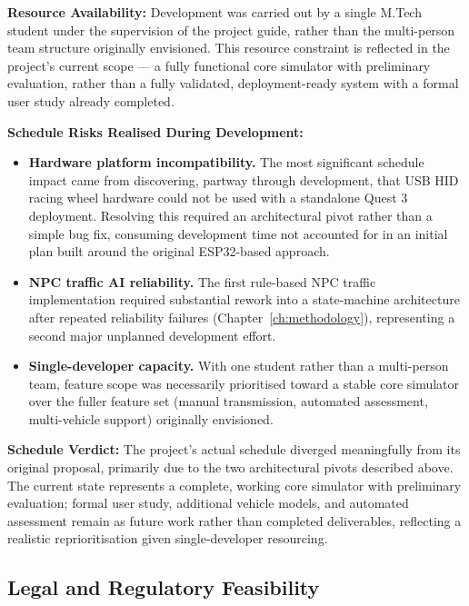 \textbf{Resource Availability:}
Development was carried out by a single M.Tech student under the supervision of the project guide, rather than the multi-person team structure originally envisioned. This resource constraint is reflected in the project's current scope — a fully functional core simulator with preliminary evaluation, rather than a fully validated, deployment-ready system with a formal user study already completed.

\textbf{Schedule Risks Realised During Development:}
\begin{itemize}
    \item \textbf{Hardware platform incompatibility.} The most significant schedule impact came from discovering, partway through development, that USB HID racing wheel hardware could not be used with a standalone Quest 3 deployment. Resolving this required an architectural pivot rather than a simple bug fix, consuming development time not accounted for in an initial plan built around the original ESP32-based approach.
    \item \textbf{NPC traffic AI reliability.} The first rule-based NPC traffic implementation required substantial rework into a state-machine architecture after repeated reliability failures (Chapter~\ref{ch:methodology}), representing a second major unplanned development effort.
    \item \textbf{Single-developer capacity.} With one student rather than a multi-person team, feature scope was necessarily prioritised toward a stable core simulator over the fuller feature set (manual transmission, automated assessment, multi-vehicle support) originally envisioned.
\end{itemize}

\textbf{Schedule Verdict:} The project's actual schedule diverged meaningfully from its original proposal, primarily due to the two architectural pivots described above. The current state represents a complete, working core simulator with preliminary evaluation; formal user study, additional vehicle models, and automated assessment remain as future work rather than completed deliverables, reflecting a realistic reprioritisation given single-developer resourcing.

\subsection{Legal and Regulatory Feasibility}

